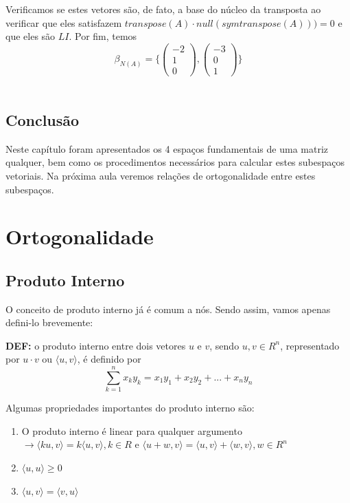 \documentclass[12pt]{article}
\begin{document}
Verificamos se estes vetores são, de fato, a base do núcleo da transposta ao verificar que eles satisfazem $transpose(A)\cdot null(symtranspose(A)))=0$ e que eles são $LI$. Por fim, temos
\begin{equation*}
	\beta_{N(A)}= \{
	\begin{pmatrix}
		-2\\
		1\\
		0
	\end{pmatrix},
	\begin{pmatrix}
		-3\\
		0\\
		1
	\end{pmatrix}	\}
\end{equation*}\\

\subsection{Conclusão}
Neste capítulo foram apresentados os 4 espaços fundamentais de uma matriz qualquer, bem como os procedimentos necessários para calcular estes subespaços vetoriais. Na próxima aula veremos relações de ortogonalidade entre estes subespaços.

\section{Ortogonalidade}
	\subsection{Produto Interno}
O conceito de produto interno já é comum a nós. Sendo assim, vamos apenas defini-lo brevemente:

\textbf{DEF:} o produto interno entre dois vetores $u$ e $v$, sendo $u,v\in R^{n}$, representado por $u\cdot v$ ou $\langle u,v \rangle$, é definido por
\begin{equation*}
	\sum_{k=1}^{n}x_k y_k=x_1 y_1+x_2 y_2+...+x_n y_n
\end{equation*}

Algumas propriedades importantes do produto interno são:
\begin{enumerate}
	\item O produto interno é linear para qualquer argumento $\rightarrow \langle ku,v \rangle=k\langle u,v \rangle,k\in R$ e $\langle u+w,v \rangle=\langle u,v \rangle+\langle w,v \rangle,w\in R^{n}$
	\item $\langle u,u \rangle\geq0$
	\item $\langle u,v \rangle=\langle v,u \rangle$
\end{enumerate}
\end{document}
